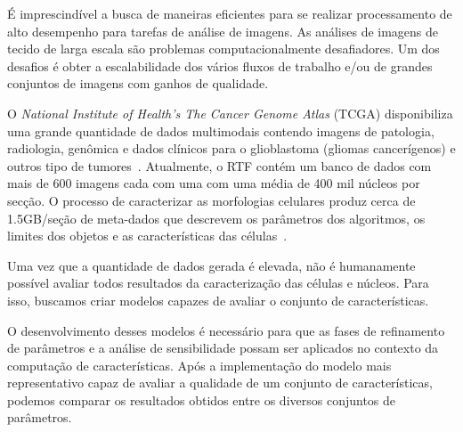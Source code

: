 \documentclass[a4paper,10pt]{article}
\begin{document}
É imprescindível a busca de maneiras eficientes para se realizar processamento de alto desempenho para tarefas de análise de imagens. As análises de imagens de tecido de larga escala são problemas computacionalmente desafiadores. Um dos desafios é obter a escalabilidade dos vários fluxos de trabalho e/ou de grandes conjuntos de imagens com ganhos de qualidade. 

O \textit{National Institute of Health’s The Cancer Genome Atlas} (TCGA) disponibiliza uma grande quantidade de dados multimodais contendo imagens de patologia, radiologia, genômica e dados clínicos para o glioblastoma (gliomas cancerígenos) e outros tipo de tumores~\cite{mclendon2008comprehensive}. Atualmente, o RTF contém um banco de dados com mais de 600 imagens cada com uma com uma média de 400 mil núcleos por secção. O processo de caracterizar as morfologias celulares produz cerca de 1.5GB/seção de meta-dados que descrevem os parâmetros dos algoritmos, os limites dos objetos e as características das células~\cite{cooper2011morphological}.

Uma vez que a quantidade de dados gerada é elevada, não é humanamente possível avaliar todos resultados da caracterização das células e núcleos. Para isso, buscamos criar modelos capazes de avaliar o conjunto de características.

O desenvolvimento desses modelos é necessário para que as fases de refinamento de parâmetros e a análise de sensibilidade possam ser aplicados no contexto da computação de características. Após a implementação do modelo mais representativo capaz de avaliar a qualidade de um conjunto de características, podemos comparar os resultados obtidos entre os diversos conjuntos de parâmetros. 

\end{document}
